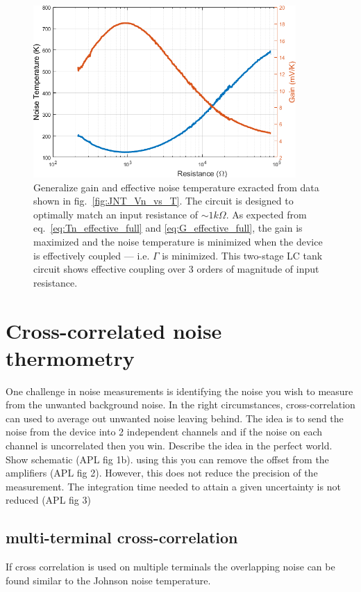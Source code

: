 \begin{figure}
\centering
\includegraphics[width = 100mm]{figures/Johnson_noise_thermometry/G_Tn_vs_R}
\caption{Generalize gain and effective noise temperature exracted from data shown in fig.~\ref{fig:JNT_Vn_vs_T}. The circuit is designed to optimally match an input resistance of ${\sim}1k\Omega$. As expected from eq.~\ref{eq:Tn_effective_full} and \ref{eq:G_effective_full}, the gain is maximized and the noise temperature is minimized when the device is effectively coupled --- i.e. $\Gamma$ is minimized. This two-stage LC tank circuit shows effective coupling over $3$ orders of magnitude of input resistance.}
\label{fig:JNT_G_Tn_vs_T}
\end{figure}



\section{Cross-correlated noise thermometry}
One challenge in noise measurements is identifying the noise you wish to measure from the unwanted background noise. In the right circumstances, cross-correlation can used to average out unwanted noise leaving behind.
The idea is to send the noise from the device into 2 independent channels and if the noise on each channel is uncorrelated then you win. Describe the idea in the perfect world. Show schematic (APL fig 1b). using this you can remove the offset from the amplifiers (APL fig 2). However, this does not reduce the precision of the measurement. The integration time needed to attain a given uncertainty is not reduced (APL fig 3)

\subsection{multi-terminal cross-correlation}
If cross correlation is used on multiple terminals the overlapping noise can be found similar to the Johnson noise temperature.
